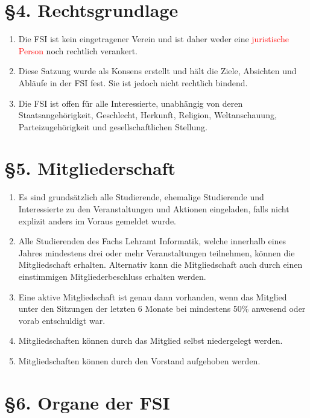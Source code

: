 \documentclass[a4paper,12pt]{article}
\newcommand{\red}[1]{\textcolor{red}{#1}}
\begin{document}
\section*{§4. Rechtsgrundlage}

\begin{enumerate}
	\item
		Die FSI ist kein eingetragener Verein und ist daher weder eine \red{
		juristische Person} noch rechtlich verankert.
	\item
		Diese Satzung wurde als Konsens erstellt und hält die Ziele,
		Absichten und Abläufe in der FSI fest. Sie ist jedoch nicht
		rechtlich bindend.
    	\item
		Die FSI ist offen für alle Interessierte, unabhängig von deren
		Staatsangehörigkeit, Geschlecht, Herkunft, Religion,
		Weltanschauung, Parteizugehörigkeit und gesellschaftlichen
		Stellung.
\end{enumerate}

\section*{§5. Mitgliederschaft}

\begin{enumerate}
	\item
		Es sind grundsätzlich alle Studierende, ehemalige Studierende
		und Interessierte zu den Veranstaltungen und Aktionen
		eingeladen, falls nicht explizit anders im Voraus gemeldet
		wurde.
    	\item
		Alle Studierenden des Fachs Lehramt Informatik, welche innerhalb
		eines Jahres mindestens drei oder mehr Veranstaltungen
		teilnehmen, können die Mitgliedschaft erhalten. Alternativ kann
		die Mitgliedschaft auch durch einen einstimmigen
		Mitgliederbeschluss erhalten werden.
	\item
		Eine aktive Mitgliedschaft ist genau dann vorhanden, wenn das
		Mitglied unter den Sitzungen der letzten 6 Monate bei mindestens
		50\% anwesend oder vorab entschuldigt war.
	\item
		Mitgliedschaften können durch das Mitglied selbst niedergelegt
		werden.
	\item 	Mitgliedschaften können durch den Vorstand aufgehoben werden.
\end{enumerate}

\section*{§6. Organe der FSI}
\end{document}
